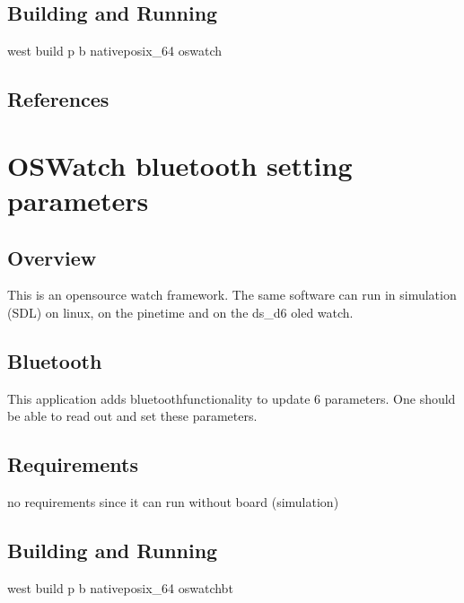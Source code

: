 \documentclass[letterpaper,10pt,english]{sphinxmanual}
\begin{document}
\subsection{Building and Running}
\label{\detokenize{samples/oswatch-batteryREADME:building-and-running}}
west build \sphinxhyphen{}p \sphinxhyphen{}b  native\sphinxhyphen{}posix\_64 oswatch


\subsection{References}
\label{\detokenize{samples/oswatch-batteryREADME:references}}

\section{OSWatch bluetooth setting parameters}
\label{\detokenize{samples/oswatch-btREADME:oswatch-bluetooth-setting-parameters}}\label{\detokenize{samples/oswatch-btREADME:oswatch}}\label{\detokenize{samples/oswatch-btREADME::doc}}

\subsection{Overview}
\label{\detokenize{samples/oswatch-btREADME:overview}}
This is an opensource watch framework.
The same software can run in simulation (SDL) on linux, on the pinetime and on the ds\_d6 oled watch.


\subsection{Bluetooth}
\label{\detokenize{samples/oswatch-btREADME:bluetooth}}
This application adds bluetoothfunctionality to update 6 parameters.
One should be able to read out and set these parameters.


\subsection{Requirements}
\label{\detokenize{samples/oswatch-btREADME:requirements}}
no requirements since it can run without board (simulation)


\subsection{Building and Running}
\label{\detokenize{samples/oswatch-btREADME:building-and-running}}
west build \sphinxhyphen{}p \sphinxhyphen{}b  native\sphinxhyphen{}posix\_64 oswatch\sphinxhyphen{}bt
\end{document}
